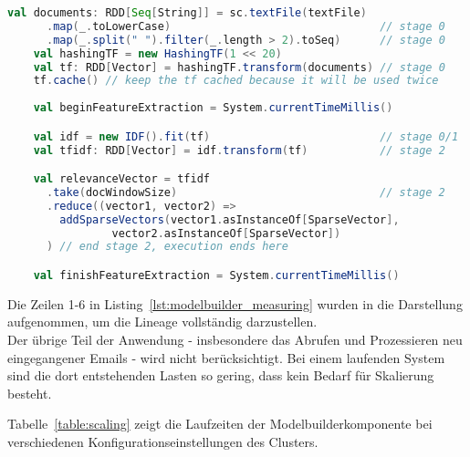 \begin{lstlisting}[language=Scala,caption={Laufzeitmessung},label={lst:modelbuilder_measuring}]
    val documents: RDD[Seq[String]] = sc.textFile(textFile)
      .map(_.toLowerCase)                                // stage 0
      .map(_.split(" ").filter(_.length > 2).toSeq)      // stage 0
    val hashingTF = new HashingTF(1 << 20)
    val tf: RDD[Vector] = hashingTF.transform(documents) // stage 0
    tf.cache() // keep the tf cached because it will be used twice
		
    val beginFeatureExtraction = System.currentTimeMillis()

    val idf = new IDF().fit(tf)                          // stage 0/1
    val tfidf: RDD[Vector] = idf.transform(tf)           // stage 2

    val relevanceVector = tfidf
      .take(docWindowSize)                               // stage 2
      .reduce((vector1, vector2) =>
        addSparseVectors(vector1.asInstanceOf[SparseVector], 
				vector2.asInstanceOf[SparseVector])
      ) // end stage 2, execution ends here

    val finishFeatureExtraction = System.currentTimeMillis()
\end{lstlisting}

Die Zeilen 1-6 in Listing~\ref{lst:modelbuilder_measuring} wurden in die Darstellung aufgenommen, um die Lineage vollständig darzustellen.\\

Der übrige Teil der Anwendung - insbesondere das Abrufen und Prozessieren neu eingegangener Emails - wird nicht berücksichtigt. Bei einem laufenden System sind die dort entstehenden Lasten so gering, dass kein Bedarf für Skalierung besteht.

Tabelle~\ref{table:scaling} zeigt die Laufzeiten der Modelbuilderkomponente bei verschiedenen Konfigurationseinstellungen des Clusters.

